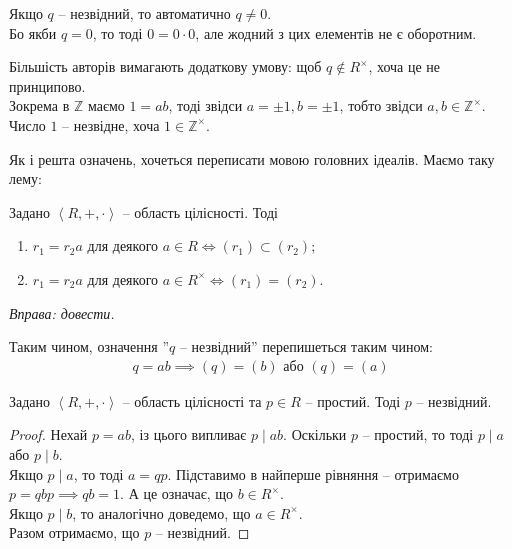 \documentclass{math_library}
\begin{document}
\begin{remark}
Якщо $q$ -- незвідний, то автоматично $q \neq 0$.\\
Бо якби $q = 0$, то тоді $0 = 0 \cdot 0$, але жодний з цих елементів не є оборотним.
\end{remark}

\begin{remark}
Більшість авторів вимагають додаткову умову: щоб $q \notin R^\times$, хоча це не принципово.\\
Зокрема в $\mathbb{Z}$ маємо $1 = ab$, тоді звідси $a = \pm 1, b = \pm 1$, тобто звідси $a,b \in \mathbb{Z}^\times$. Число $1$ -- незвідне, хоча $1 \in \mathbb{Z}^\times$.
\end{remark}

\noindent Як і решта означень, хочеться переписати мовою головних ідеалів. Маємо таку лему:
\begin{lemma}
Задано $\left<R,+,\cdot \right>$ -- область цілісності. Тоді
\begin{enumerate}[nosep,wide=0pt,label={\arabic*)}]
\item $r_1 = r_2a$ для деякого $a \in R \iff (r_1) \subset (r_2)$;
\item $r_1 = r_2a$ для деякого $a \in R^\times \iff (r_1) = (r_2)$.
\end{enumerate}
\textit{Вправа: довести.}
\end{lemma}

Таким чином, означення ''$q$ -- незвідний'' перепишеться таким чином:
\begin{align*}
q = ab \implies (q) = (b) \text{ або } (q) = (a)
\end{align*}

\begin{proposition}
Задано $\left<R,+,\cdot \right>$ -- область цілісності та $p \in R$ -- простий. Тоді $p$ -- незвідний.
\end{proposition}

\begin{proof}
Нехай $p = ab$, із цього випливає $p \mid ab$. Оскільки $p$ -- простий, то тоді $p \mid a$ або $p \mid b$.\\
Якщо $p \mid a$, то тоді $a = qp$. Підставимо в найперше рівняння -- отримаємо $p = qbp \implies qb = 1$. А це означає, що $b \in R^\times$.\\
Якщо $p \mid b$, то аналогічно доведемо, що $a \in R^\times$.\\
Разом отримаємо, що $p$ -- незвідний.
\end{proof}
\end{document}
